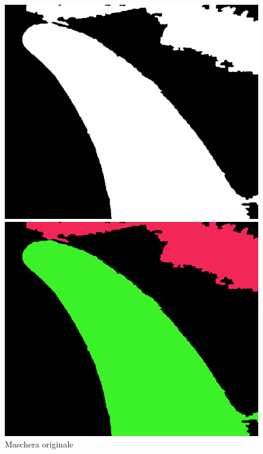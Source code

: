 \documentclass[a4paper,12pt]{report}
\begin{document}
      \begin{figure}[H]
        \centering
        \begin{minipage}{0.3\textwidth}
          \centering
          \includegraphics[width=\textwidth]{assets/images/methods/porting/alg_area/original.png}   
          \caption{Maschera originale}
        \end{minipage}
        \begin{minipage}{0.3\textwidth}
          \centering
          \includegraphics[width=\textwidth]{assets/images/methods/porting/alg_area/find.png}  

\end{minipage}
\end{figure}
\end{document}
